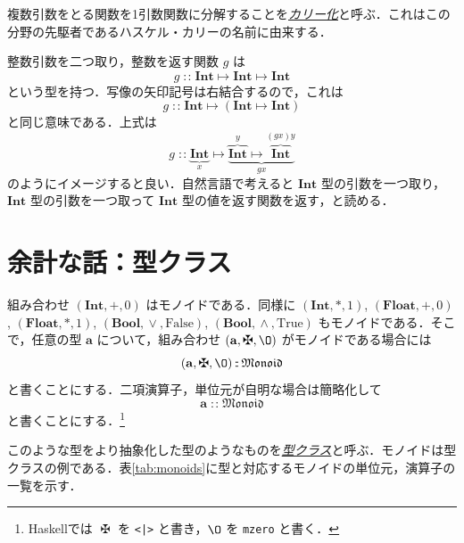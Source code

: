 \documentclass[a4paper]{jsbook}
\newcommand{\programminglanguage}[1]{\textsf{#1}}
\newcommand{\haskell}{\programminglanguage{Haskell}}
\newcommand{\keyword}[1]{{\underline{\emph{#1}}}}
\newcommand{\code}[1]{\texttt{#1}}
\newcommand{\mSpecialConst}[1]{\mathrm{#1}} %
\newcommand{\mTrue}{\mSpecialConst{True}}
\newcommand{\mFalse}{\mSpecialConst{False}}
\newcommand{\mZero}{\O}
\newcommand{\mTupleWith}[1]{\left(#1\right)}
\newcommand{\mType}[1]{\mathbf{#1}}
\newcommand{\mBoolType}{\mType{Bool}}
\newcommand{\mIntType}{\mType{Int}}
\newcommand{\mFloatType}{\mType{Float}}
\newcommand{\mSpecialTypeClass}[1]{\mathfrak{#1}} %
\newcommand{\mMonoidTypeClass}{\mSpecialTypeClass{Monoid}}
\DeclareMathOperator{\mIn}{{:\!:}}
\DeclareMathOperator{\mMapsTo}{\mapsto}
\DeclareMathOperator{\mPlus}{\maltese}
\DeclareMathOperator{\mLogicalAnd}{\wedge}
\DeclareMathOperator{\mLogicalOr}{\vee}
\newcommand{\mProj}[2]{#1\mMapsTo#2}
\begin{document}
複数引数をとる関数を1引数関数に分解することを\keyword{カリー化}と呼ぶ．これはこの分野の先駆者であるハスケル・カリーの名前に由来する．


整数引数を二つ取り，整数を返す関数 $g$ は
\begin{equation}
g\mIn\mProj{\mIntType}{\mProj{\mIntType}{\mIntType}}
\end{equation}
という型を持つ．写像の矢印記号は右結合するので，これは
\begin{equation}
g\mIn\mProj{\mIntType}{\left(\mProj{\mIntType}{\mIntType}\right)}
\end{equation}
と同じ意味である．上式は
\begin{equation*}
g\mIn
\underbrace{\mIntType}_x
\mMapsTo
\underbrace{\overbrace{\mIntType}^y
\mMapsTo\overbrace{\mIntType}^{(gx)y}}_{gx}
\end{equation*}
のようにイメージすると良い．自然言語で考えると $\mIntType$ 型の引数を一つ取り，$\mIntType$ 型の引数を一つ取って $\mIntType$ 型の値を返す関数を返す，と読める．


\section{余計な話：型クラス}

組み合わせ $\mTupleWith{\mIntType,+,0}$ はモノイドである．同様に $\mTupleWith{\mIntType,*,1}$, $\mTupleWith{\mFloatType,+,0}$, $\mTupleWith{\mFloatType,*,1}$, $\mTupleWith{\mBoolType,\mLogicalOr,\mFalse}$, $\mTupleWith{\mBoolType,\mLogicalAnd,\mTrue}$ もモノイドである．そこで，任意の型 $\mType{a}$ について，組み合わせ $\mTupleWith{\mType{a},\mPlus,\mZero}$ がモノイドである場合には
\begin{equation}
\mTupleWith{\mType{a},\mPlus,\mZero}\mIn\mMonoidTypeClass
\end{equation}
と書くことにする．二項演算子，単位元が自明な場合は簡略化して
\begin{equation}
\mType{a}\mIn\mMonoidTypeClass
\end{equation}
と書くことにする．\footnote{\haskell では $\mPlus$ を \code{<|>} と書き，$\mZero$ を \code{mzero} と書く．}

このような型をより抽象化した型のようなものを\keyword{型クラス}と呼ぶ．モノイドは型クラスの例である．表\ref{tab:monoids}に型と対応するモノイドの単位元，演算子の一覧を示す．
\end{document}
